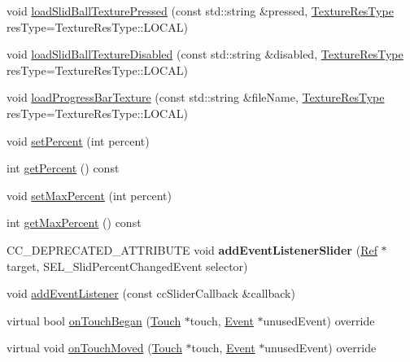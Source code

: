 \begin{DoxyCompactItemize}
\item 
void \hyperlink{classui_1_1Slider_a86cb93cd2b0c422864fcdad7a5484825}{load\+Slid\+Ball\+Texture\+Pressed} (const std\+::string \&pressed, \hyperlink{classui_1_1Widget_a040a65ec5ad3b11119b7e16b98bd9af0}{Texture\+Res\+Type} res\+Type=Texture\+Res\+Type\+::\+L\+O\+C\+AL)
\item 
void \hyperlink{classui_1_1Slider_a6d4531a15ed308e060d681ef99d97ce0}{load\+Slid\+Ball\+Texture\+Disabled} (const std\+::string \&disabled, \hyperlink{classui_1_1Widget_a040a65ec5ad3b11119b7e16b98bd9af0}{Texture\+Res\+Type} res\+Type=Texture\+Res\+Type\+::\+L\+O\+C\+AL)
\item 
void \hyperlink{classui_1_1Slider_a7d4ee10a1661d3ca873288b92600dc54}{load\+Progress\+Bar\+Texture} (const std\+::string \&file\+Name, \hyperlink{classui_1_1Widget_a040a65ec5ad3b11119b7e16b98bd9af0}{Texture\+Res\+Type} res\+Type=Texture\+Res\+Type\+::\+L\+O\+C\+AL)
\item 
void \hyperlink{classui_1_1Slider_a720aa3007f2716699790494cd6731c6c}{set\+Percent} (int percent)
\item 
int \hyperlink{classui_1_1Slider_ad9612cb3d778733a4d5456ebe3892e44}{get\+Percent} () const
\item 
void \hyperlink{classui_1_1Slider_a08507a91d537eeb3b30596512ab3ac6e}{set\+Max\+Percent} (int percent)
\item 
int \hyperlink{classui_1_1Slider_a9938f947d4e314d3447f7d2375cad373}{get\+Max\+Percent} () const
\item 
\mbox{\label{classui_1_1Slider_a055e5548ea1081a5b895e043d40e816e}} 
C\+C\+\_\+\+D\+E\+P\+R\+E\+C\+A\+T\+E\+D\+\_\+\+A\+T\+T\+R\+I\+B\+U\+TE void {\bfseries add\+Event\+Listener\+Slider} (\hyperlink{classRef}{Ref} $\ast$target, S\+E\+L\+\_\+\+Slid\+Percent\+Changed\+Event selector)
\item 
void \hyperlink{classui_1_1Slider_af03961eee2f27eb9f96a090fb860220f}{add\+Event\+Listener} (const cc\+Slider\+Callback \&callback)
\item 
virtual bool \hyperlink{classui_1_1Slider_af3407f0844a379de234e2d321f3fb562}{on\+Touch\+Began} (\hyperlink{classTouch}{Touch} $\ast$touch, \hyperlink{classEvent}{Event} $\ast$unused\+Event) override
\item 
virtual void \hyperlink{classui_1_1Slider_abc18db1077436cc39bebc3e9c245a8a7}{on\+Touch\+Moved} (\hyperlink{classTouch}{Touch} $\ast$touch, \hyperlink{classEvent}{Event} $\ast$unused\+Event) override
\item 

\end{DoxyCompactItemize}
